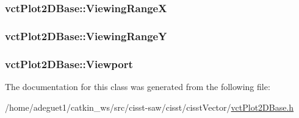 \hypertarget{classvct_plot2_d_base_aac54c32c843faaba49bfa0424ac4009f}{
\subsubsection[{Viewing\-Range\-X}]{ vct\-Plot2\-D\-Base\-::\-Viewing\-Range\-X\hspace{0.3cm}{\ttfamily [protected]}}}\label{classvct_plot2_d_base_aac54c32c843faaba49bfa0424ac4009f}
\hypertarget{classvct_plot2_d_base_a61aef57ba3009eef0104325f64c8524f}{
\subsubsection[{Viewing\-Range\-Y}]{ vct\-Plot2\-D\-Base\-::\-Viewing\-Range\-Y\hspace{0.3cm}{\ttfamily [protected]}}}\label{classvct_plot2_d_base_a61aef57ba3009eef0104325f64c8524f}
\hypertarget{classvct_plot2_d_base_a35e351a70eb6b942f80d354a74a9eb8b}{
\subsubsection[{Viewport}]{ vct\-Plot2\-D\-Base\-::\-Viewport\hspace{0.3cm}{\ttfamily [protected]}}}\label{classvct_plot2_d_base_a35e351a70eb6b942f80d354a74a9eb8b}


The documentation for this class was generated from the following file\-:\begin{DoxyCompactItemize}
\item 
/home/adeguet1/catkin\-\_\-ws/src/cisst-\/saw/cisst/cisst\-Vector/\hyperlink{vct_plot2_d_base_8h}{vct\-Plot2\-D\-Base.\-h}\end{DoxyCompactItemize}
